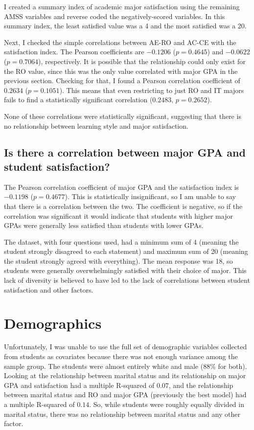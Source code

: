 I created a summary index of academic major satisfaction using the remaining AMSS variables and reverse coded the negatively-scored variables. In this summary index, the least satisfied value was a 4 and the most satisfied was a 20.

Next, I checked the simple correlations between AE-RO and AC-CE with the satisfaction index. The Pearson coefficients are $-0.1206$ ($p=0.4645$) and $-0.0622$ ($p=0.7064$), respectively. It is possible that the relationship could only exist for the RO value, since this was the only value correlated with major GPA in the previous section. Checking for that, I found a Pearson correlation coefficient of $0.2634$ ($p=0.1051$). This means that even restricting to just RO and IT majors fails to find a statistically significant correlation ($0.2483$, $p=0.2652$).

None of these correlations were statistically significant, suggesting that there is no relationship between learning style and major satisfaction.

\subsection{Is there a correlation between major GPA and student satisfaction?}
The Pearson correlation coefficient of major GPA and the satisfaction index is $-0.1198$ ($p=0.4677$). This is statistically insignificant, so I am unable to say that there is a correlation between the two. The coefficient is negative, so if the correlation was significant it would indicate that students with higher major GPAs were generally less satisfied than students with lower GPAs.

The dataset, with four questions used, had a minimum sum of 4 (meaning the student strongly disagreed to each statement) and maximum sum of 20 (meaning the student strongly agreed with everything). The mean response was 18, so students were generally overwhelmingly satisfied with their choice of major. This lack of diversity is believed to have led to the lack of correlations between student satisfaction and other factors.

\section{Demographics}
Unfortunately, I was unable to use the full set of demographic variables collected from students as covariates because there was not enough variance among the sample group. The students were almost entirely white and male (88\% for both). Looking at the relationship between marital status and its relationship on major GPA and satisfaction had a multiple R-squared of $0.07$, and the relationship between marital status and RO and major GPA (previously the best model) had a multiple R-squared of $0.14$. So, while students were roughly equally divided in marital status, there was no relationship between marital status and any other factor.
